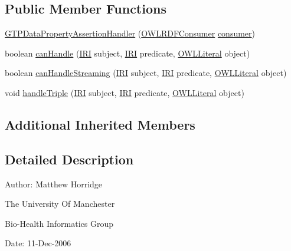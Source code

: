 \subsection*{Public Member Functions}
\begin{DoxyCompactItemize}
\item 
\hyperlink{classorg_1_1coode_1_1owlapi_1_1rdfxml_1_1parser_1_1_g_t_p_data_property_assertion_handler_a4f80cb8d618e5f0883eb4232ecb59012}{G\-T\-P\-Data\-Property\-Assertion\-Handler} (\hyperlink{classorg_1_1coode_1_1owlapi_1_1rdfxml_1_1parser_1_1_o_w_l_r_d_f_consumer}{O\-W\-L\-R\-D\-F\-Consumer} \hyperlink{classorg_1_1coode_1_1owlapi_1_1rdfxml_1_1parser_1_1_abstract_triple_handler_a4ccf4d898ff01eb1cadfa04b23d54e9c}{consumer})
\item 
boolean \hyperlink{classorg_1_1coode_1_1owlapi_1_1rdfxml_1_1parser_1_1_g_t_p_data_property_assertion_handler_ad39a3df8457caead674c4e2e30eb3478}{can\-Handle} (\hyperlink{classorg_1_1semanticweb_1_1owlapi_1_1model_1_1_i_r_i}{I\-R\-I} subject, \hyperlink{classorg_1_1semanticweb_1_1owlapi_1_1model_1_1_i_r_i}{I\-R\-I} predicate, \hyperlink{interfaceorg_1_1semanticweb_1_1owlapi_1_1model_1_1_o_w_l_literal}{O\-W\-L\-Literal} object)
\item 
boolean \hyperlink{classorg_1_1coode_1_1owlapi_1_1rdfxml_1_1parser_1_1_g_t_p_data_property_assertion_handler_a4202186464ff836dabea77ad6ce657a2}{can\-Handle\-Streaming} (\hyperlink{classorg_1_1semanticweb_1_1owlapi_1_1model_1_1_i_r_i}{I\-R\-I} subject, \hyperlink{classorg_1_1semanticweb_1_1owlapi_1_1model_1_1_i_r_i}{I\-R\-I} predicate, \hyperlink{interfaceorg_1_1semanticweb_1_1owlapi_1_1model_1_1_o_w_l_literal}{O\-W\-L\-Literal} object)
\item 
void \hyperlink{classorg_1_1coode_1_1owlapi_1_1rdfxml_1_1parser_1_1_g_t_p_data_property_assertion_handler_a47b736d30e2cf80848375658f2b697ae}{handle\-Triple} (\hyperlink{classorg_1_1semanticweb_1_1owlapi_1_1model_1_1_i_r_i}{I\-R\-I} subject, \hyperlink{classorg_1_1semanticweb_1_1owlapi_1_1model_1_1_i_r_i}{I\-R\-I} predicate, \hyperlink{interfaceorg_1_1semanticweb_1_1owlapi_1_1model_1_1_o_w_l_literal}{O\-W\-L\-Literal} object)
\end{DoxyCompactItemize}
\subsection*{Additional Inherited Members}


\subsection{Detailed Description}
Author\-: Matthew Horridge\par
 The University Of Manchester\par
 Bio-\/\-Health Informatics Group\par
 Date\-: 11-\/\-Dec-\/2006\par
\par
 

